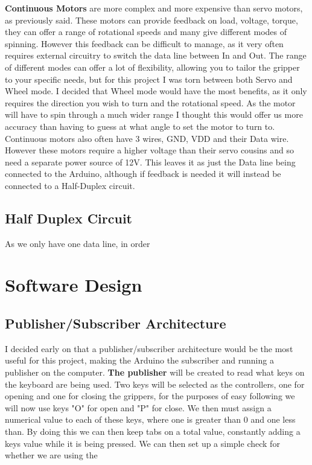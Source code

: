 \documentclass{l4proj}
\begin{document}
\textbf{Continuous Motors} are more complex and more expensive than servo motors, as previously said. These motors can provide feedback on load, voltage, torque, they can offer a range of rotational speeds and many give different modes of spinning. However this feedback can be difficult to manage, as it very often requires external circuitry to switch the data line between In and Out. The range of different modes can offer a lot of flexibility, allowing you to tailor the gripper to your specific needs, but for this project I was torn between both Servo and Wheel mode. I decided that Wheel mode would have the most benefits, as it only requires the direction you wish to turn and the rotational speed. As the motor will have to spin through a much wider range I thought this would offer us more accuracy than having to guess at what angle to set the motor to turn to. \\
Continuous motors also often have 3 wires, GND, VDD and their Data wire. However these motors require a higher voltage than their servo cousins and so need a separate power source of 12V. This leaves it as just the Data line being connected to the Arduino, although if feedback is needed it will instead be connected to a Half-Duplex circuit. 

\subsection{Half Duplex Circuit}
As we only have one data line, in order 


\section{Software Design}
\subsection{Publisher/Subscriber Architecture}
I decided early on that a publisher/subscriber architecture would be the most useful for this project, making the Arduino the subscriber and running a publisher on the computer.
\textbf{The publisher} will be created to read what keys on the keyboard are being used. Two keys will be selected as the controllers, one for opening and one for closing the grippers, for the purposes of easy following we will now use keys "O" for open and "P" for close. We then must assign a numerical value to each of these keys, where one is greater than 0 and one less than. By doing this we can then keep tabs on a total value, constantly adding a keys value while it is being pressed. We can then set up a simple check for whether we are using the 
\end{document}
